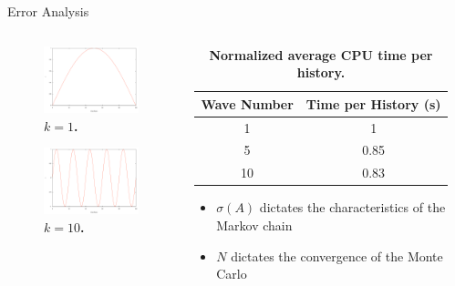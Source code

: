 \documentclass{beamer}
\begin{document}
\begin{frame}{Error Analysis}

  \begin{columns}

    \begin{column}{0.5\textwidth}

      \begin{figure}[h!]
        \includegraphics[width=1.5in]{mode_1.pdf}
        \caption{\textbf{$k = 1$.}}
      \end{figure}

      \begin{figure}[b]
        \includegraphics[width=1.5in]{mode_10.pdf}
        \caption{\textbf{$k = 10$.}}
      \end{figure}

    \end{column}

    \begin{column}{0.5\textwidth}

      { \tiny
      \begin{table}[h!]
        \begin{center}
          \begin{tabular}{cc}\hline\hline
            \multicolumn{1}{c}{\textbf{Wave Number}} & 
            \multicolumn{1}{c}{\textbf{Time per History (s)}} \\
            \hline
            1 & 1 \\
            5 & 0.85 \\
            10 & 0.83 \\
            \hline\hline
          \end{tabular}
        \end{center}
        \caption{\textbf{Normalized average CPU time per history.}}
        \label{tab:mc_timing}
      \end{table}
      }

      \begin{itemize}
        \item $\sigma(A)$ dictates the characteristics of the Markov
          chain
        \item $N$ dictates the convergence of the Monte Carlo
      \end{itemize}

    \end{column}

  \end{columns}

\end{frame}
\end{document}
